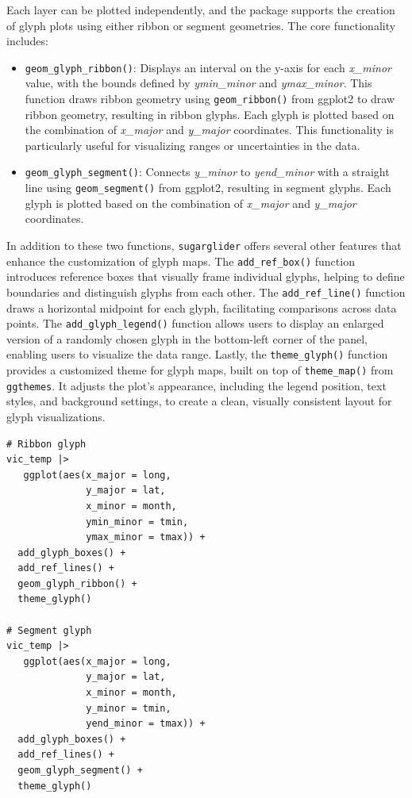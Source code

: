 Each layer can be plotted independently, and the package supports the creation of glyph plots using either ribbon or segment geometries. The core functionality includes:

\begin{itemize}
\item
  \texttt{geom\_glyph\_ribbon()}: Displays an interval on the y-axis for each \emph{x\_minor} value, with the bounds defined by \emph{ymin\_minor} and \emph{ymax\_minor}. This function draws ribbon geometry using \texttt{geom\_ribbon()} from ggplot2 to draw ribbon geometry, resulting in ribbon glyphs. Each glyph is plotted based on the combination of \emph{x\_major} and \emph{y\_major} coordinates. This functionality is particularly useful for visualizing ranges or uncertainties in the data.
\item
  \texttt{geom\_glyph\_segment()}: Connects \emph{y\_minor} to \emph{yend\_minor} with a straight line using \texttt{geom\_segment()} from ggplot2, resulting in segment glyphs. Each glyph is plotted based on the combination of \emph{x\_major} and \emph{y\_major} coordinates.
\end{itemize}

In addition to these two functions, \texttt{sugarglider} offers several other features that enhance the customization of glyph maps. The \texttt{add\_ref\_box()} function introduces reference boxes that visually frame individual glyphs, helping to define boundaries and distinguish glyphs from each other. The \texttt{add\_ref\_line()} function draws a horizontal midpoint for each glyph, facilitating comparisons across data points. The \texttt{add\_glyph\_legend()} function allows users to display an enlarged version of a randomly chosen glyph in the bottom-left corner of the panel, enabling users to visualize the data range. Lastly, the \texttt{theme\_glyph()} function provides a customized theme for glyph maps, built on top of \texttt{theme\_map()} from \texttt{ggthemes}. It adjusts the plot's appearance, including the legend position, text styles, and background settings, to create a clean, visually consistent layout for glyph visualizations.

\begin{verbatim}
# Ribbon glyph
vic_temp |>
   ggplot(aes(x_major = long,
              y_major = lat,
              x_minor = month,
              ymin_minor = tmin,
              ymax_minor = tmax)) +
  add_glyph_boxes() +
  add_ref_lines() +
  geom_glyph_ribbon() +
  theme_glyph()

# Segment glyph
vic_temp |>
   ggplot(aes(x_major = long,
              y_major = lat,
              x_minor = month,
              y_minor = tmin,
              yend_minor = tmax)) +
  add_glyph_boxes() +
  add_ref_lines() +
  geom_glyph_segment() +
  theme_glyph()
\end{verbatim}

